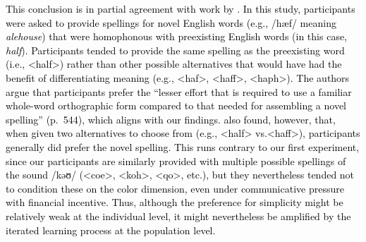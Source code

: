 \documentclass[doc,biblatex]{apa7}
\newcommand\newmaterial[1]{\textcolor{black}{#1}}
\begin{document}
\newmaterial{This conclusion is in partial agreement with work by \textcite{Treiman:2015}. In this study, participants were asked to provide spellings for novel English words (e.g., /hæf/ meaning \textit{alehouse}) that were homophonous with preexisting English words (in this case, \textit{half}). Participants tended to provide the same spelling as the preexisting word (i.e., <half>) rather than other possible alternatives that would have had the benefit of differentiating meaning (e.g., <haf>, <haff>, <haph>). The authors argue that participants prefer the ``lesser effort that is required to use a familiar whole-word orthographic form compared to that needed for assembling a novel spelling'' (p.~544), which aligns with our findings. \textcite{Treiman:2015} also found, however, that, when given two alternatives to choose from (e.g., <half> vs.\@ <haff>), participants generally did prefer the novel spelling. This runs contrary to our first experiment, since our participants are similarly provided with multiple possible spellings of the sound /kəʊ/ (<coe>, <koh>, <qo>, etc.), but they nevertheless tended not to condition these on the color dimension, even under communicative pressure with financial incentive. Thus, although the preference for simplicity might be relatively weak at the individual level, it might nevertheless be amplified by the iterated learning process at the population level.}
\end{document}
